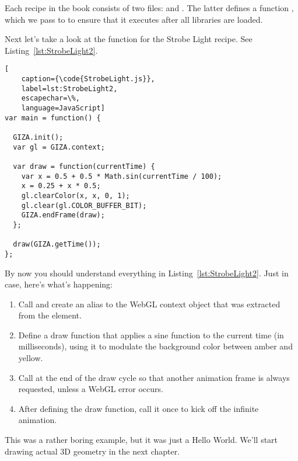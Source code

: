 Each recipe in the book consists of two files:  and .  The latter defines a function , which we pass to  to ensure that it executes after all libraries are loaded.

\begin{comment}
{RecipeName}.js
{RecipeName}.html
common.js
css/style.css
lib/head.load.min.js
lib/giza.min.js
lib/stats.min.js
\end{comment}

Next let's take a look at the  function for the Strobe Light recipe.  See Listing~\ref{lst:StrobeLight2}.

\begin{lstlisting}[
    caption={\code{StrobeLight.js}},
    label=lst:StrobeLight2,
    escapechar=\%,
    language=JavaScript]
var main = function() {

  GIZA.init();
  var gl = GIZA.context;

  var draw = function(currentTime) {
    var x = 0.5 + 0.5 * Math.sin(currentTime / 100);
    x = 0.25 + x * 0.5;
    gl.clearColor(x, x, 0, 1);
    gl.clear(gl.COLOR_BUFFER_BIT);
    GIZA.endFrame(draw);
  };

  draw(GIZA.getTime());
};
\end{lstlisting} 

By now you should understand everything in Listing~\ref{lst:StrobeLight2}.  Just in case, here's what's happening:

\begin{enumerate}
\item Call  and create an alias to the WebGL context object that was extracted from the  element.
\item Define a draw function that applies a sine function to the current time (in milliseconds), using it to modulate the background color between amber and yellow.
\item Call  at the end of the draw cycle so that another animation frame is always requested, unless a WebGL error occurs.
\item After defining the draw function, call it once to kick off the infinite animation.
\end{enumerate}

This was a rather boring example, but it was just a Hello World.  We'll start drawing actual 3D geometry in the next chapter.

